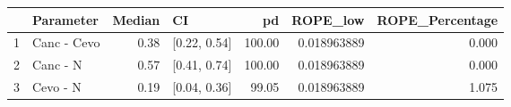 \begin{table}[ht]
\centering
\begin{tabular}{llrlrrr}
  \hline
 & Parameter & Median & CI & pd & ROPE\_low & ROPE\_Percentage \\ 
  \hline
1 & Canc - Cevo & 0.38 & [0.22, 0.54] & 100.00 & 0.018963889 & 0.000 \\ 
  2 & Canc - N & 0.57 & [0.41, 0.74] & 100.00 & 0.018963889 & 0.000 \\ 
  3 & Cevo - N & 0.19 & [0.04, 0.36] & 99.05 & 0.018963889 & 1.075 \\ 
   \hline
\end{tabular}
\end{table}

